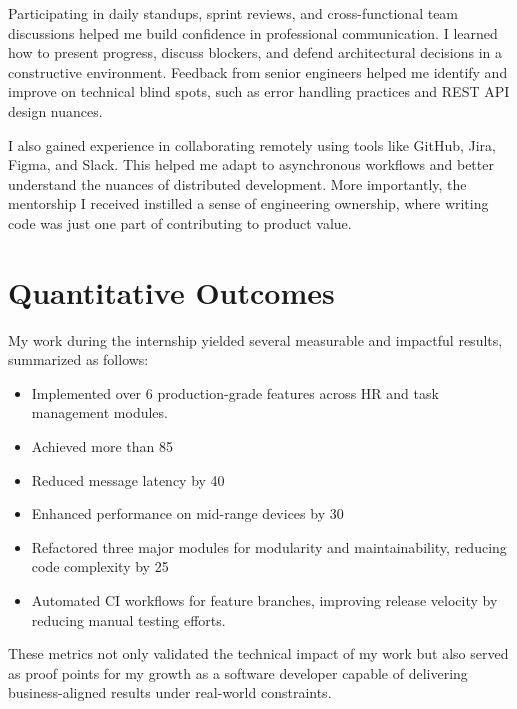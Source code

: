 Participating in daily standups, sprint reviews, and cross-functional team discussions helped me build confidence in professional communication. I learned how to present progress, discuss blockers, and defend architectural decisions in a constructive environment. Feedback from senior engineers helped me identify and improve on technical blind spots, such as error handling practices and REST API design nuances.

I also gained experience in collaborating remotely using tools like GitHub, Jira, Figma, and Slack. This helped me adapt to asynchronous workflows and better understand the nuances of distributed development. More importantly, the mentorship I received instilled a sense of engineering ownership, where writing code was just one part of contributing to product value.

\section{Quantitative Outcomes}

My work during the internship yielded several measurable and impactful results, summarized as follows:
\begin{itemize}
\item Implemented over 6 production-grade features across HR and task management modules.
\item Achieved more than 85%
\item Reduced message latency by 40%
\item Enhanced performance on mid-range devices by 30%
\item Refactored three major modules for modularity and maintainability, reducing code complexity by 25%
\item Automated CI workflows for feature branches, improving release velocity by reducing manual testing efforts.
\end{itemize}

These metrics not only validated the technical impact of my work but also served as proof points for my growth as a software developer capable of delivering business-aligned results under real-world constraints.
